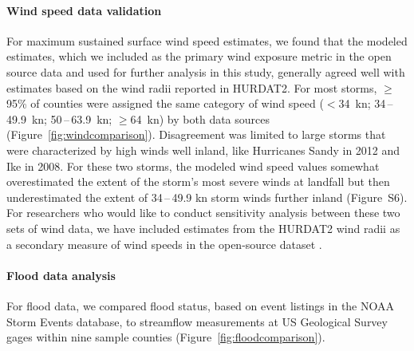 \paragraph{Wind speed data validation}

For maximum sustained surface wind speed estimates, we found that the modeled
estimates, which we included as the primary wind exposure metric in the open
source data and used for further analysis in this study, generally agreed well
with estimates based on the wind radii reported in \ac{HURDAT2}. For most
storms, $\ge$95\% of counties were assigned the same category of wind speed
($<$34~\si{\knot}; 34\,--\,49.9~\si{\knot}; 50\,--\,63.9~\si{\knot};
$\ge$64~\si{\knot}) by both data sources (Figure~\ref{fig:windcomparison}).
Disagreement was limited to large storms that were characterized by high winds
well inland, like Hurricanes Sandy in 2012 and Ike in 2008. For these two
storms, the modeled wind speed values somewhat overestimated the extent of the
storm's most severe winds at landfall but then underestimated the extent of
34\,--\,49.9 \si{\knot} storm winds further inland (Figure~S6). For researchers
who would like to conduct sensitivity analysis between these two sets of wind
data, we have included estimates from the \ac{HURDAT2} wind radii as a
secondary measure of wind speeds in the open-source dataset
\parencite{hurricaneexposuredata}.

\paragraph{Flood data analysis}

For flood data, we compared flood status, based on event listings in the NOAA
Storm Events database, to streamflow measurements at \ac{US} Geological Survey
gages within nine sample counties (Figure~\ref{fig:floodcomparison}).   

